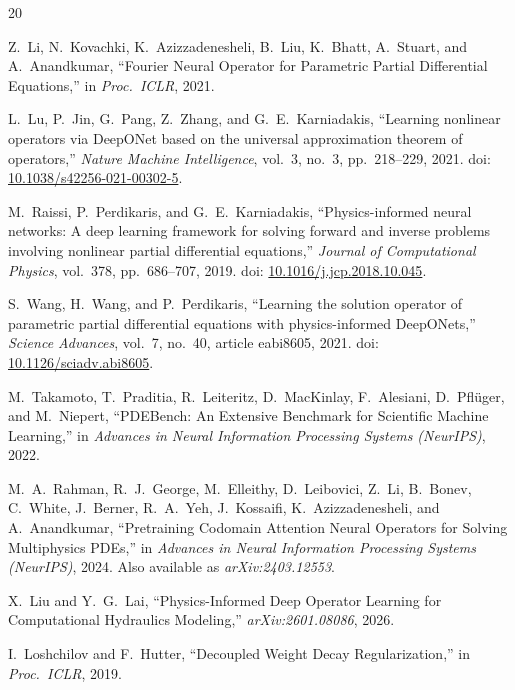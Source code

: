 \documentclass[11pt,a4paper]{article}
\begin{document}
\begin{thebibliography}{20}

Z.~Li, N.~Kovachki, K.~Azizzadenesheli, B.~Liu, K.~Bhatt, A.~Stuart, and A.~Anandkumar,
``Fourier Neural Operator for Parametric Partial Differential Equations,''
in \textit{Proc.\ ICLR}, 2021.

L.~Lu, P.~Jin, G.~Pang, Z.~Zhang, and G.~E.~Karniadakis,
``Learning nonlinear operators via DeepONet based on the universal approximation theorem of operators,''
\textit{Nature Machine Intelligence}, vol.~3, no.~3, pp.~218--229, 2021.
doi: \href{https://doi.org/10.1038/s42256-021-00302-5}{10.1038/s42256-021-00302-5}.

M.~Raissi, P.~Perdikaris, and G.~E.~Karniadakis,
``Physics-informed neural networks: A deep learning framework for solving forward and inverse problems involving nonlinear partial differential equations,''
\textit{Journal of Computational Physics}, vol.~378, pp.~686--707, 2019.
doi: \href{https://doi.org/10.1016/j.jcp.2018.10.045}{10.1016/j.jcp.2018.10.045}.

S.~Wang, H.~Wang, and P.~Perdikaris,
``Learning the solution operator of parametric partial differential equations with physics-informed DeepONets,''
\textit{Science Advances}, vol.~7, no.~40, article eabi8605, 2021.
doi: \href{https://doi.org/10.1126/sciadv.abi8605}{10.1126/sciadv.abi8605}.

M.~Takamoto, T.~Praditia, R.~Leiteritz, D.~MacKinlay, F.~Alesiani, D.~Pfl\"{u}ger, and M.~Niepert,
``PDEBench: An Extensive Benchmark for Scientific Machine Learning,''
in \emph{Advances in Neural Information Processing Systems (NeurIPS)}, 2022.

M.~A.~Rahman, R.~J.~George, M.~Elleithy, D.~Leibovici, Z.~Li, B.~Bonev, C.~White, J.~Berner, R.~A.~Yeh, J.~Kossaifi, K.~Azizzadenesheli, and A.~Anandkumar,
``Pretraining Codomain Attention Neural Operators for Solving Multiphysics PDEs,''
in \emph{Advances in Neural Information Processing Systems (NeurIPS)}, 2024.
Also available as \emph{arXiv:2403.12553}.

X.~Liu and Y.~G.~Lai,
``Physics-Informed Deep Operator Learning for Computational Hydraulics Modeling,''
\emph{arXiv:2601.08086}, 2026.

I.~Loshchilov and F.~Hutter,
``Decoupled Weight Decay Regularization,''
in \textit{Proc.\ ICLR}, 2019.


\end{thebibliography}
\end{document}

